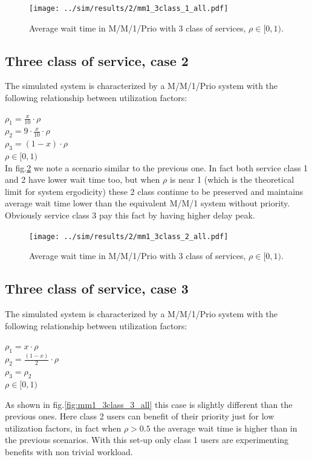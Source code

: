 \documentclass{llncs}
\newcommand{\labelsec}[1]{\label{sec:#1}}
\begin{document}
\begin{figure}
\centering
\texttt{[image: ../sim/results/2/mm1\_3class\_1\_all.pdf]}
\caption{Average wait time in M/M/1/Prio with 3 class of services, $\rho \in [0,1)$.}
\label{fig:mm1_3class_1_all}
\end{figure}
\newpage
\subsection{Three class of service, case 2}
\labelsec{MG1PRIO_3class_2}

The simulated system is characterized by a M/M/1/Prio system with the following relationship between utilization factors:

\begin{center}
$\rho_1 = \frac{x}{10} \cdot \rho $\\
$\rho_2 = 9 \cdot \frac{x}{10} \cdot \rho$\\
$\rho_3 = (1-x) \cdot \rho$\\
$\rho \in [0,1)$ \\
In fig.\ref{fig:mm1_3class_2_all} we note a scenario similar to the previous one. In fact both service class 1 and 2 have lower wait time too, but when $\rho$ is near 1 (which is the theoretical limit for system ergodicity) these 2 class continue to be preserved and maintains average wait time lower than the equivalent M/M/1 system without priority. Obviously service class 3 pay this fact by having higher delay peak.
\end{center}

\begin{figure}
\centering
\texttt{[image: ../sim/results/2/mm1\_3class\_2\_all.pdf]}
\caption{Average wait time in M/M/1/Prio with 3 class of services, $\rho \in [0,1)$.}
\label{fig:mm1_3class_2_all}
\end{figure}
\newpage
\subsection{Three class of service, case 3}
\labelsec{MG1PRIO_3class_3}

The simulated system is characterized by a M/M/1/Prio system with the following relationship between utilization factors:
\begin{center}
$\rho_1 = x \cdot \rho $ \\
$\rho_2 = \frac{(1-x)}{2} \cdot \rho$ \\  
$\rho_3 = \rho_2 $ \\
$\rho \in [0,1)  $ \\
\end{center}
As shown in fig.\ref{fig:mm1_3class_3_all} this case is slightly different than the previous ones. Here class 2 users can benefit of their priority just for low utilization factors, in fact when $\rho > 0.5$ the average wait time is higher than in the previous scenarios. With this set-up only class 1 users are experimenting benefits with non trivial workload.
\end{document}
